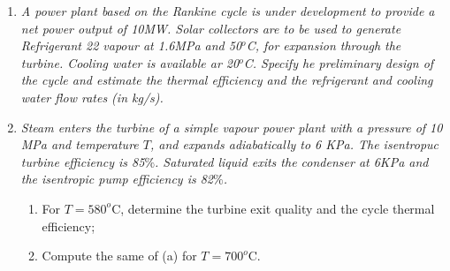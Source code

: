 \documentclass[12pts,a4paper,amsmath,amssymb,floatfix]{article}%
\begin{document}
\begin{enumerate}[label=\bfseries Problem \arabic*]
\item {\it A power plant based on the Rankine cycle is under development to provide a net power output of 10MW. Solar collectors are to be used to generate Refrigerant 22 vapour at 1.6MPa and 50$^{o}$C, for expansion through the turbine. Cooling water is available ar 20$^{o}$C. Specify he preliminary design of the cycle and estimate the thermal efficiency and the refrigerant and cooling water flow rates (in kg/s).}



\item {\it Steam enters the turbine of a simple vapour power plant with a pressure of 10 MPa and temperature $T$, and expands adiabatically to 6 KPa. The isentropuc turbine efficiency is 85$\%$. Saturated liquid exits the condenser at 6KPa and the isentropic pump efficiency is 82$\%$.
\begin{enumerate}
\item For $T=580^{o}$C, determine the turbine exit quality and the cycle thermal efficiency;
\item Compute the same of (a) for $T=700^{o}$C.
\end{enumerate}
}





\end{enumerate}
\end{document}
